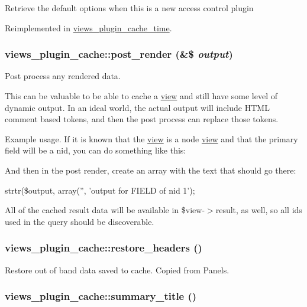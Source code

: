Retrieve the default options when this is a new access control plugin 

Reimplemented in \hyperlink{classviews__plugin__cache__time_c89ed6d01b1bd3b9853166b2048ece8e}{views\_\-plugin\_\-cache\_\-time}.\hypertarget{classviews__plugin__cache_ac0aacd51f591fd161fb5fb1d735e3a8}{
\subsubsection[{post\_\-render}]{\setlength{\rightskip}{0pt plus 5cm}views\_\-plugin\_\-cache::post\_\-render (\&\$ {\em output})}}
\label{classviews__plugin__cache_ac0aacd51f591fd161fb5fb1d735e3a8}


Post process any rendered data.

This can be valuable to be able to cache a \hyperlink{classview}{view} and still have some level of dynamic output. In an ideal world, the actual output will include HTML comment based tokens, and then the post process can replace those tokens.

Example usage. If it is known that the \hyperlink{classview}{view} is a node \hyperlink{classview}{view} and that the primary field will be a nid, you can do something like this:

And then in the post render, create an array with the text that should go there:

strtr(\$output, array('', 'output for FIELD of nid 1');

All of the cached result data will be available in \$view-$>$result, as well, so all ids used in the query should be discoverable. \hypertarget{classviews__plugin__cache_950552f19c93dc2132e73acc4c9198ac}{
\subsubsection[{restore\_\-headers}]{\setlength{\rightskip}{0pt plus 5cm}views\_\-plugin\_\-cache::restore\_\-headers ()}}
\label{classviews__plugin__cache_950552f19c93dc2132e73acc4c9198ac}


Restore out of band data saved to cache. Copied from Panels. \hypertarget{classviews__plugin__cache_35e5232e39c8148476328e302787d16b}{
\subsubsection[{summary\_\-title}]{\setlength{\rightskip}{0pt plus 5cm}views\_\-plugin\_\-cache::summary\_\-title ()}}
\label{classviews__plugin__cache_35e5232e39c8148476328e302787d16b}


